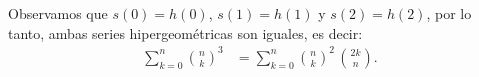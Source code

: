 \begin{solucion}
Observamos que $s(0)=h(0)$, $s(1)=h(1)$ y $s(2)=h(2)$, por lo tanto, ambas series hipergeométricas son iguales, es decir:
\begin{align*}
  \sum_{k=0}^{n} \binom{n}{k}^{3} &= \sum_{k=0}^{n} \binom{n}{k}^{2} \,\binom{2k}{n}.
\end{align*}
\end{solucion}